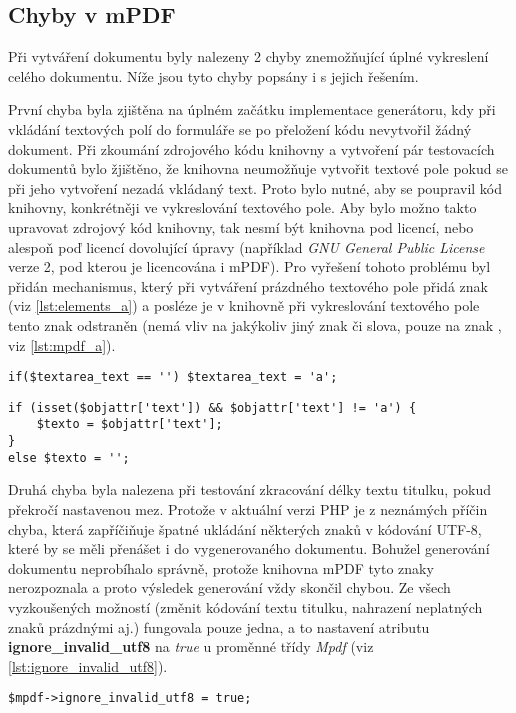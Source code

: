 \subsection{Chyby v mPDF}
Při vytváření dokumentu byly nalezeny 2 chyby znemožňující úplné vykreslení celého dokumentu. Níže jsou tyto chyby popsány i s jejich řešením.
\par
První chyba byla zjištěna na úplném začátku implementace generátoru, kdy při vkládání textových polí do formuláře se po přeložení kódu nevytvořil žádný dokument. Při zkoumání zdrojového kódu knihovny a vytvoření pár testovacích dokumentů bylo žjištěno, že knihovna neumožňuje vytvořit textové pole pokud se při jeho vytvoření nezadá vkládaný text. Proto bylo nutné, aby se poupravil kód knihovny, konkrétněji ve vykreslování textového pole. Aby bylo možno takto upravovat zdrojový kód knihovny, tak nesmí být knihovna pod licencí, nebo alespoň poď licencí dovolující úpravy (například \textit{GNU General Public License} verze 2, pod kterou je licencována i mPDF). Pro vyřešení tohoto problému byl přidán mechanismus, který při vytváření prázdného textového pole přidá znak  (viz \ref{lst:elements_a}) a posléze je v knihovně při vykreslování textového pole tento znak odstraněn (nemá vliv na jakýkoliv jiný znak či slova, pouze na znak , viz \ref{lst:mpdf_a}).
\begin{lstlisting}[caption = {Přiřazení znaku \uv{\textbf{a}} jako text textového pole (HTMLElements.php)}, label = {lst:elements_a}, captionpos=b]
if($textarea_text == '') $textarea_text = 'a';
\end{lstlisting}
\begin{lstlisting}[caption = {Odstranění znaku \uv{\textbf{a}} z textového pole (Mpdf.php)}, label = {lst:mpdf_a}, captionpos=b]
if (isset($objattr['text']) && $objattr['text'] != 'a') {
	$texto = $objattr['text'];
}
else $texto = '';
\end{lstlisting}
\par
Druhá chyba byla nalezena při testování zkracování délky textu titulku, pokud překročí nastavenou mez. Protože v aktuální verzi PHP je z neznámých příčin chyba, která zapříčiňuje špatné ukládání některých znaků v kódování UTF-8, které by se měli přenášet i do vygenerovaného dokumentu. Bohužel generování dokumentu neprobíhalo správně, protože knihovna mPDF tyto znaky nerozpoznala a proto výsledek generování vždy skončil chybou. Ze všech vyzkoušených možností (změnit kódování textu titulku, nahrazení neplatných znaků prázdnými aj.) fungovala pouze jedna, a to nastavení atributu \textbf{ignore\_invalid\_utf8} na \textit{true} u proměnné třídy \textit{Mpdf} (viz \ref{lst:ignore_invalid_utf8}).
\begin{lstlisting}[caption = {Nastavení atributu \textbf{ignore\_invalid\_utf8} (orlib.php)}, label = {lst:ignore_invalid_utf8}, captionpos=b]
$mpdf->ignore_invalid_utf8 = true;
\end{lstlisting}

